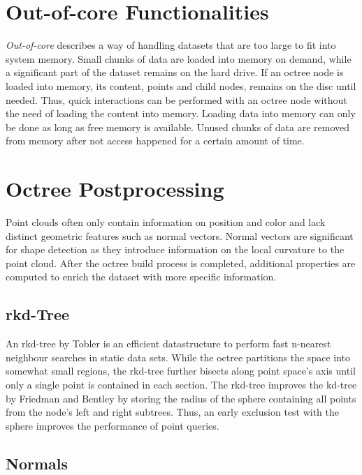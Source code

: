 \section{Out-of-core Functionalities}

\textit{Out-of-core} describes a way of handling datasets that are too large to fit into system memory. Small chunks of data are loaded into memory on demand, while a significant part of the dataset remains on the hard drive. If an octree node is loaded into memory, its content, points and child nodes, remains on the disc until needed. Thus, quick interactions can be performed with an octree node without the need of loading the content into memory. 
Loading data into memory can only be done as long as free memory is available. Unused chunks of data are removed from memory after not access happened for a certain amount of time. 


\section{Octree Postprocessing}

Point clouds often only contain information on position and color and lack distinct geometric features such as normal vectors. Normal vectors are significant for shape detection as they introduce information on the local curvature to the point cloud. After the octree build process is completed, additional properties are computed to enrich the dataset with more specific information. 


\subsection{rkd-Tree}

An rkd-tree by Tobler \cite{tobler2011rkd} is an efficient datastructure to perform fast n-nearest neighbour searches in static data sets. While the octree partitions the space into somewhat small regions, the rkd-tree further bisects along point space's axis until only a single point is contained in each section. The rkd-tree improves the kd-tree by Friedman and Bentley \cite{friedman1975algorithm} by storing the radius of the sphere containing all points from the node's left and right subtrees. Thus, an early exclusion test with the sphere improves the performance of point queries.  


\subsection{Normals}

